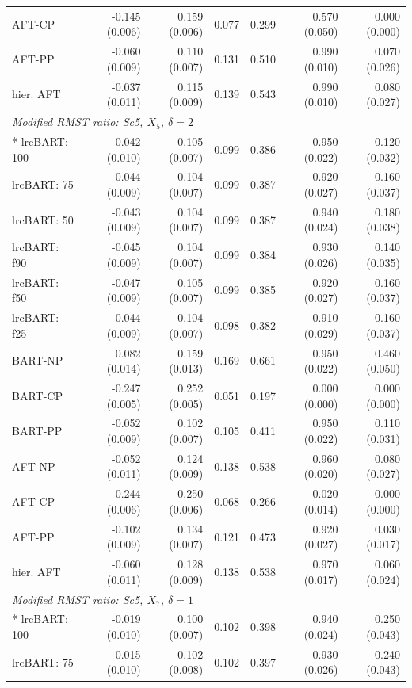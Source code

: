 \begin{landscape}
\begin{longtable}{lrrrrrr}
AFT-CP & -0.145 (0.006) & 0.159 (0.006) & 0.077 & 0.299 & 0.570 (0.050) & 0.000 (0.000) \\
AFT-PP & -0.060 (0.009) & 0.110 (0.007) & 0.131 & 0.510 & 0.990 (0.010) & 0.070 (0.026) \\
hier. AFT & -0.037 (0.011) & 0.115 (0.009) & 0.139 & 0.543 & 0.990 (0.010) & 0.080 (0.027) \\
\multicolumn{7}{l}{\strut\textit{Modified RMST ratio: Sc5, $X_5$, $\delta=2$}}\\*
lrcBART: 100 & -0.042 (0.010) & 0.105 (0.007) & 0.099 & 0.386 & 0.950 (0.022) & 0.120 (0.032) \\
lrcBART: 75 & -0.044 (0.009) & 0.104 (0.007) & 0.099 & 0.387 & 0.920 (0.027) & 0.160 (0.037) \\
lrcBART: 50 & -0.043 (0.009) & 0.104 (0.007) & 0.099 & 0.387 & 0.940 (0.024) & 0.180 (0.038) \\
lrcBART: f90 & -0.045 (0.009) & 0.104 (0.007) & 0.099 & 0.384 & 0.930 (0.026) & 0.140 (0.035) \\
lrcBART: f50 & -0.047 (0.009) & 0.105 (0.007) & 0.099 & 0.385 & 0.920 (0.027) & 0.160 (0.037) \\
lrcBART: f25 & -0.044 (0.009) & 0.104 (0.007) & 0.098 & 0.382 & 0.910 (0.029) & 0.160 (0.037) \\
BART-NP & 0.082 (0.014) & 0.159 (0.013) & 0.169 & 0.661 & 0.950 (0.022) & 0.460 (0.050) \\
BART-CP & -0.247 (0.005) & 0.252 (0.005) & 0.051 & 0.197 & 0.000 (0.000) & 0.000 (0.000) \\
BART-PP & -0.052 (0.009) & 0.102 (0.007) & 0.105 & 0.411 & 0.950 (0.022) & 0.110 (0.031) \\
AFT-NP & -0.052 (0.011) & 0.124 (0.009) & 0.138 & 0.538 & 0.960 (0.020) & 0.080 (0.027) \\
AFT-CP & -0.244 (0.006) & 0.250 (0.006) & 0.068 & 0.266 & 0.020 (0.014) & 0.000 (0.000) \\
AFT-PP & -0.102 (0.009) & 0.134 (0.007) & 0.121 & 0.473 & 0.920 (0.027) & 0.030 (0.017) \\
hier. AFT & -0.060 (0.011) & 0.128 (0.009) & 0.138 & 0.538 & 0.970 (0.017) & 0.060 (0.024) \\
\multicolumn{7}{l}{\strut\textit{Modified RMST ratio: Sc5, $X_7$, $\delta=1$}}\\*
lrcBART: 100 & -0.019 (0.010) & 0.100 (0.007) & 0.102 & 0.398 & 0.940 (0.024) & 0.250 (0.043) \\
lrcBART: 75 & -0.015 (0.010) & 0.102 (0.008) & 0.102 & 0.397 & 0.930 (0.026) & 0.240 (0.043) \\

\end{longtable}
\end{landscape}
